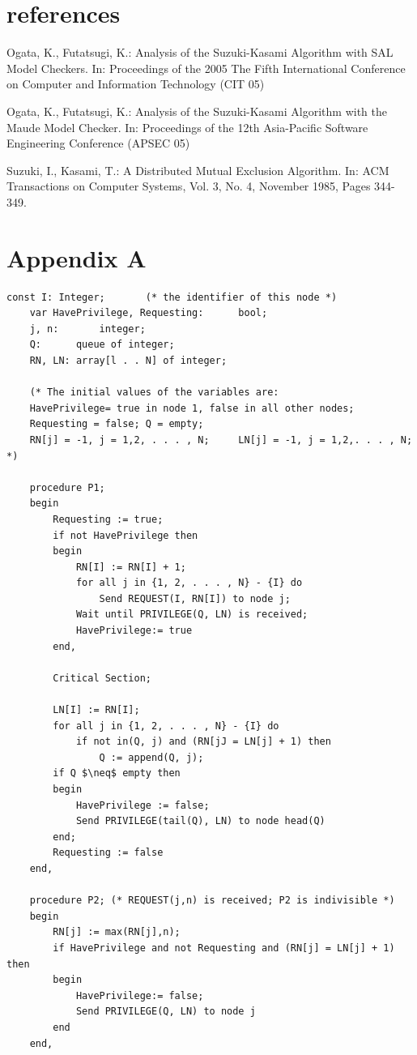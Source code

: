 \documentclass[a4paper,10pt]{llncs}
\begin{document}
\section{references}
\begin{thebibliography}{4}

Ogata, K., Futatsugi, K.: Analysis of the Suzuki-Kasami Algorithm with SAL Model Checkers. In: 
Proceedings of the 2005 The Fifth International Conference on Computer and Information Technology (CIT 05)

 Ogata, K., Futatsugi, K.: Analysis of the Suzuki-Kasami Algorithm with the Maude Model Checker. In: 
Proceedings of the 12th Asia-Pacific Software Engineering Conference (APSEC 05)

 Suzuki, I., Kasami, T.: A Distributed Mutual Exclusion Algorithm. In: 
ACM Transactions on Computer Systems, Vol. 3, No. 4, November 1985, Pages 344-349.


\end{thebibliography}

\newpage
\appendix
\section{Appendix A}
\label{sec:ska}

\begin{lstlisting}[label=some-code,caption=Suzuki and Kasami's algorithm,mathescape]
const I: Integer;		(* the identifier of this node *)
	var HavePrivilege, Requesting:		bool;
	j, n:	 	integer;
	Q: 		queue of integer;
	RN, LN:	array[l . . N] of integer;

	(* The initial values of the variables are:
	HavePrivilege= true in node 1, false in all other nodes;
	Requesting = false; Q = empty;
	RN[j] = -1, j = 1,2, . . . , N;  	LN[j] = -1, j = 1,2,. . . , N; *)

	procedure P1;
	begin
		Requesting := true;
		if not HavePrivilege then
		begin
			RN[I] := RN[I] + 1;
			for all j in {1, 2, . . . , N} - {I} do
				Send REQUEST(I, RN[I]) to node j;
			Wait until PRIVILEGE(Q, LN) is received;
			HavePrivilege:= true
		end,
	
		Critical Section;

		LN[I] := RN[I];
		for all j in {1, 2, . . . , N} - {I} do
			if not in(Q, j) and (RN[jJ = LN[j] + 1) then
				Q := append(Q, j);
		if Q $\neq$ empty then
		begin
			HavePrivilege := false;
			Send PRIVILEGE(tail(Q), LN) to node head(Q)
		end;
		Requesting := false
	end,

	procedure P2; (* REQUEST(j,n) is received; P2 is indivisible *)
	begin
		RN[j] := max(RN[j],n);
		if HavePrivilege and not Requesting and (RN[j] = LN[j] + 1) then
		begin
			HavePrivilege:= false;
			Send PRIVILEGE(Q, LN) to node j
		end
	end,

\end{lstlisting}
\newpage
\end{document}
